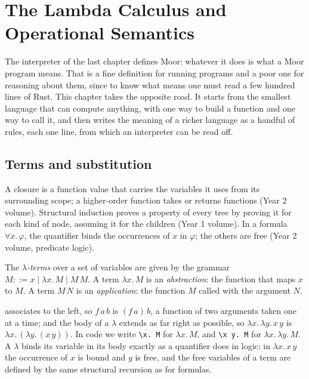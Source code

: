 \chapter{The Lambda Calculus and Operational Semantics}\label{ch:b3:lambda-calculus}

The interpreter of the last chapter defines Moor: whatever it does is what a Moor program means. That is a fine definition for running programs and a poor one for reasoning about them, since to know what  means one must read a few hundred lines of Rust. This chapter takes the opposite road. It starts from the smallest language that can compute anything, with one way to build a function and one way to call it, and then writes the meaning of a richer language as a handful of rules, each one line, from which an interpreter can be read off.

\section{Terms and substitution}\label{sec:b3:lambda-calculus:terms}

\begin{recall}
A closure is a function value that carries the variables it uses from its surrounding scope; a higher-order function takes or returns functions (Year 2 volume). Structural induction proves a property of every tree by proving it for each kind of node, assuming it for the children (Year 1 volume). In a formula $\forall x.\,\varphi$, the quantifier binds the occurrences of $x$ in $\varphi$; the others are free (Year 2 volume, predicate logic).
\end{recall}

\begin{definition}\label{def:b3:lambda-calculus:terms}
The \emph{$\lambda$-terms} over a set of variables are given by the grammar $M ::= x \mid \lambda x.\,M \mid M\,M$. A term $\lambda x.\,M$ is an \emph{abstraction}: the function that maps $x$ to $M$. A term $M\,N$ is an \emph{application}: the function $M$ called with the argument $N$.
\end{definition}

 associates to the left, so $f\,a\,b$ is $(f\,a)\,b$, a function of two arguments taken one at a time; and the body of a $\lambda$ extends as far right as possible, so $\lambda x.\,\lambda y.\,x\,y$ is $\lambda x.\,(\lambda y.\,(x\,y))$. In code we write \texttt{\textbackslash{}x.\ M} for $\lambda x.\,M$, and \texttt{\textbackslash{}x y.\ M} for $\lambda x.\,\lambda y.\,M$. A $\lambda$ binds its variable in its body exactly as a quantifier does in logic: in $\lambda x.\,x\,y$ the occurrence of $x$ is bound and $y$ is free, and the free variables of a term are defined by the same structural recursion as for formulas.

